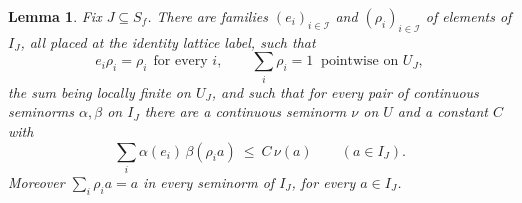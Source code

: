 \documentclass[11pt]{amsart}
\newtheorem{lemma}[theorem]{Lemma}
\theoremstyle{definition}
\theoremstyle{remark}
\begin{document}
\begin{lemma}\label{lem:partition}
Fix $J\subseteq S_f$.  There are families $(e_i)_{i\in\mathcal I}$ and
$(\rho_i)_{i\in\mathcal I}$ of elements of $I_J$, all placed at the identity
lattice label, such that
\begin{equation}\label{eq:partition}
e_i\rho_i=\rho_i\ \ \text{for every }i,\qquad
\sum_i\rho_i=1\ \text{ pointwise on }U_J ,
\end{equation}
the sum being locally finite on $U_J$, and such that for every pair of
continuous seminorms $\alpha,\beta$ on $I_J$ there are a continuous seminorm
$\nu$ on $U$ and a constant $C$ with
\begin{equation}\label{eq:summable}
\sum_i\alpha(e_i)\,\beta(\rho_i a)\ \le\ C\,\nu(a)\qquad(a\in I_J).
\end{equation}
Moreover $\sum_i\rho_ia=a$ in every seminorm of $I_J$, for every $a\in I_J$.
\end{lemma}
\end{document}
